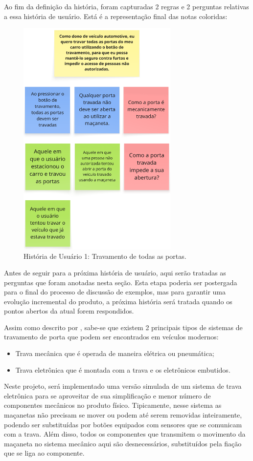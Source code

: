 Ao fim da definição da história, foram capturadas 2 regras e 2 perguntas relativas a essa história de usuário. Está é a representação final das notas coloridas:

\begin{figure}[H]
\centering
\includegraphics[height=12cm]{figuras/user_story_1.png}
\caption{História de Usuário 1: Travamento de todas as portas.}
\label{fig:historia1}
\end{figure}

Antes de seguir para a próxima história de usuário, aqui serão tratadas as perguntas que foram anotadas nesta seção. Esta etapa poderia ser postergada 
para o final do processo de discussão de exemplos, mas para garantir uma evolução incremental do produto, a próxima história será tratada quando os pontos 
abertos da atual forem respondidos.

Assim como descrito por \cite{reif2017locking}, sabe-se que existem 2 principais tipos de sistemas de travamento de porta que podem ser encontrados em veículos modernos:
\begin{itemize}
    \item Trava mecânica que é operada de maneira elétrica ou pneumática;
    \item Trava eletrônica que é montada com a trava e os eletrônicos embutidos.
\end{itemize}

Neste projeto, será implementado uma versão simulada de um sistema de trava eletrônica para se aproveitar de sua simplificação e menor número de componentes 
mecânicos no produto físico. Tipicamente, nesse sistema as maçanetas não precisam se mover ou podem até serem removidas inteiramente, podendo ser substituídas 
por botões equipados com sensores que se comunicam com a trava. Além disso, todos os componentes que transmitem o movimento da maçaneta no sistema mecânico aqui 
são desnecessários, substituídos pela fiação que se liga ao componente.

